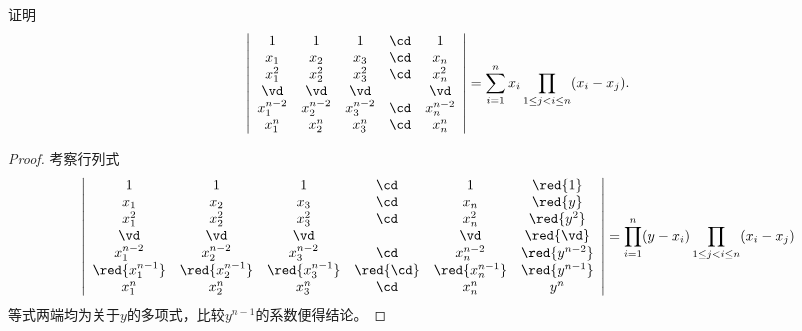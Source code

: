 \begin{frame}





\begin{testexample}
  证明
  $$
  \left|
    \begin{array}{ccccc}
      1&1&1&\cd&1\\
      x_1&x_2&x_3&\cd&x_n\\
      x_1^2&x_2^2&x_3^2&\cd&x_n^2\\
      \vd&\vd&\vd&&\vd\\
      x_1^{n-2}&x_2^{n-2}&x_3^{n-2}&\cd&x_n^{n-2}\\
      x_1^{n}&x_2^{n}&x_3^{n}&\cd&x_n^{n}\\
    \end{array}
  \right| = \sum_{i=1}^{n}x_i \prod_{1\le j < i \le n}(x_i-x_j).
  $$
\end{testexample}

\begin{proof}
考察行列式
$$
\left|
  \begin{array}{cccccc}
    1&1&1&\cd&1&\red{1}\\
    x_1&x_2&x_3&\cd&x_n&\red{y}\\
    x_1^2&x_2^2&x_3^2&\cd&x_n^2&\red{y^2}\\
    \vd&\vd&\vd&&\vd&\red{\vd}\\
    x_1^{n-2}&x_2^{n-2}&x_3^{n-2}&\cd&x_n^{n-2}&\red{y^{n-2}}\\
    \red{x_1^{n-1}}&\red{x_2^{n-1}}&\red{x_3^{n-1}}&\red{\cd}&\red{x_n^{n-1}}&\red{y^{n-1}}\\
    x_1^{n}&x_2^{n}&x_3^{n}&\cd&x_n^{n}&y^n\\
  \end{array}
\right| = \prod_{i=1}^n(y-x_i) \prod_{1\le j < i \le n} (x_i-x_j)
$$
等式两端均为关于$y$的多项式，比较$y^{n-1}$的系数便得结论。


\end{proof}



\end{frame}

